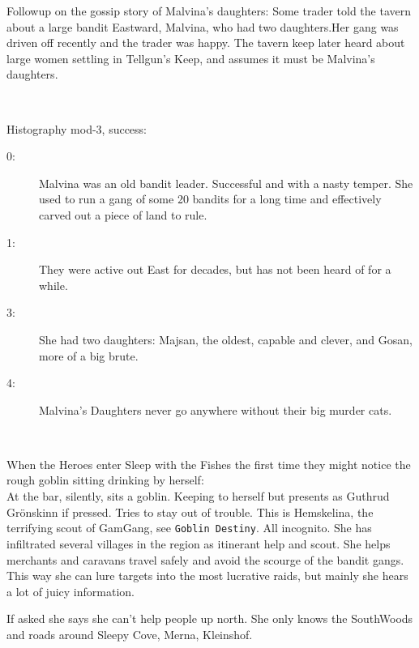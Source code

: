Followup on the gossip story of Malvina's daughters: Some trader told the tavern about a large bandit Eastward, Malvina, who had two daughters.Her gang was driven off recently and the trader was happy. The tavern keep later heard about large women settling in Tellgun's Keep, and assumes it must be Malvina's daughters.

\

\noindent
Histography mod-3, success:
\begin{description}
   \item[0:] Malvina was an old bandit leader. Successful and with a nasty temper. She used to run a gang of some 20 bandits for a long time and effectively carved out a piece of land to rule.
   \item[1:] They were active out East for decades, but has not been heard of for a while.
   \item[3:] She had two daughters: Majsan, the oldest, capable and clever, and Gosan, more of a big brute.
   \item[4:] Malvina's Daughters never go anywhere without their big murder cats.
\end{description}

\

When the Heroes enter Sleep with the Fishes the first time they might notice the rough goblin sitting drinking by herself: \\
At the bar, silently, sits a goblin. Keeping to herself but presents as Guthrud Grönskinn if pressed. Tries to stay out of trouble. This is Hemskelina, the terrifying scout of GamGang, see \texttt{Goblin Destiny}. All incognito. She has infiltrated several villages in the region as itinerant help and scout. She helps merchants and caravans travel safely and avoid the scourge of the bandit gangs. This way she can lure targets into the most lucrative raids, but mainly she hears a lot of juicy information.

If asked she says she can't help people up north. She only knows the SouthWoods and roads around Sleepy Cove, Merna, Kleinshof.








